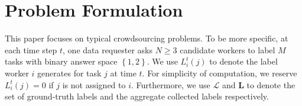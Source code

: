 \section{Problem Formulation}
\label{PF}
This paper focuses on typical crowdsourcing problems. To be more specific, at each time step $t$, one data requester asks $N \geq 3$ candidate workers to label $M$ tasks with binary answer space $\left\{1,2\right\}$. We use $L^t_i(j)$ to denote the label worker $i$ generates for task $j$ at time $t$. For simplicity of computation, we reserve $L^t_i(j) = 0$ if  $j$ is not assigned to $i$. Furthermore, we use $\mathcal{L}$ and $\bm{L}$ to denote the set of ground-truth labels and  the aggregate collected labels respectively.


